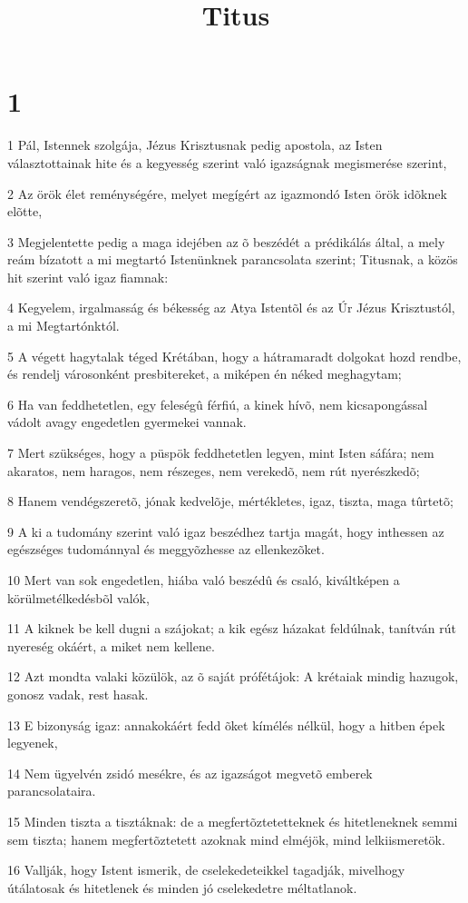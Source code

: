 

\title{Titus}


\chapter{1}

\par 1 Pál, Istennek szolgája, Jézus Krisztusnak pedig apostola, az Isten választottainak hite és a kegyesség szerint való igazságnak megismerése szerint,
\par 2 Az örök élet reménységére, melyet megígért az igazmondó Isten örök idõknek elõtte,
\par 3 Megjelentette pedig a maga idejében az õ beszédét a prédikálás által, a mely reám bízatott  a mi megtartó Istenünknek parancsolata szerint; Titusnak, a közös hit szerint való igaz fiamnak:
\par 4 Kegyelem, irgalmasság és békesség az Atya Istentõl és az Úr Jézus Krisztustól, a mi Megtartónktól.
\par 5 A végett hagytalak téged Krétában, hogy a hátramaradt dolgokat hozd rendbe, és rendelj városonként presbitereket, a miképen én néked meghagytam;
\par 6 Ha van feddhetetlen, egy feleségû férfiú, a kinek hívõ, nem kicsapongással vádolt avagy engedetlen gyermekei vannak.
\par 7 Mert szükséges, hogy a püspök feddhetetlen legyen, mint Isten sáfára; nem akaratos, nem haragos, nem részeges, nem verekedõ, nem rút nyerészkedõ;
\par 8 Hanem vendégszeretõ, jónak kedvelõje, mértékletes, igaz, tiszta, maga tûrtetõ;
\par 9 A ki a tudomány szerint való igaz beszédhez tartja magát, hogy inthessen az egészséges tudománnyal és meggyõzhesse az ellenkezõket.
\par 10 Mert van sok engedetlen, hiába való beszédû és csaló, kiváltképen a körülmetélkedésbõl valók,
\par 11 A kiknek be kell dugni a szájokat; a kik egész házakat feldúlnak, tanítván rút nyereség okáért, a miket nem kellene.
\par 12 Azt mondta valaki közülök, az õ saját prófétájok: A krétaiak mindig hazugok, gonosz vadak, rest hasak.
\par 13 E bizonyság igaz: annakokáért fedd õket kímélés nélkül, hogy a hitben épek legyenek,
\par 14 Nem ügyelvén zsidó mesékre, és az igazságot megvetõ emberek parancsolataira.
\par 15 Minden tiszta a tisztáknak: de a megfertõztetetteknek és hitetleneknek semmi sem tiszta; hanem megfertõztetett azoknak mind elméjök, mind lelkiismeretök.
\par 16 Vallják, hogy Istent ismerik, de cselekedeteikkel tagadják, mivelhogy útálatosak és hitetlenek és minden jó cselekedetre méltatlanok.

